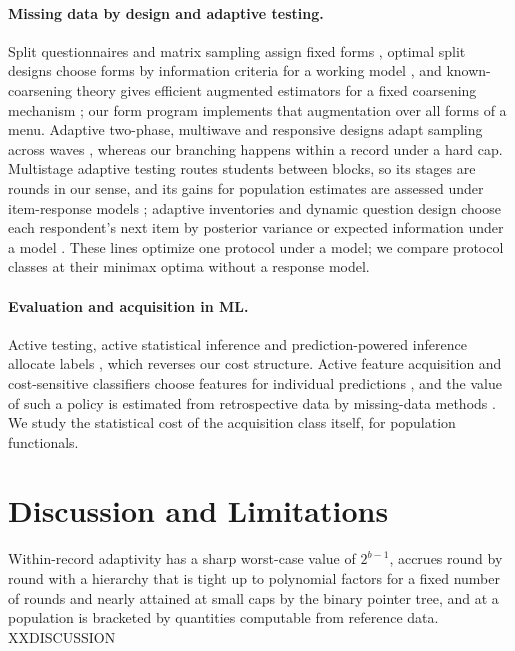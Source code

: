 \documentclass{article}
\begin{document}
\paragraph{Missing data by design and adaptive testing.} Split questionnaires and matrix sampling assign fixed forms \citep{raghunathan1995,graham2006,thomas2006,chipperfield2009,rhemtulla2012}, optimal split designs choose forms by information criteria for a working model \citep{adiguzel2008}, and known-coarsening theory gives efficient augmented estimators for a fixed coarsening mechanism \citep{robins1994,tsiatis2006}; our form program implements that augmentation over all forms of a menu. Adaptive two-phase, multiwave and responsive designs adapt sampling across waves \citep{groves2006,tao2020,chen2020,chen2022}, whereas our branching happens within a record under a hard cap. Multistage adaptive testing routes students between blocks, so its stages are rounds in our sense, and its gains for population estimates are assessed under item-response models \citep{yamamoto2018,fink2024,konig2026}; adaptive inventories and dynamic question design choose each respondent's next item by posterior variance or expected information under a model \citep{montgomery2020,zhang2020,fukuda2026}. These lines optimize one protocol under a model; we compare protocol classes at their minimax optima without a response model.

\paragraph{Evaluation and acquisition in ML.} Active testing, active statistical inference and prediction-powered inference allocate labels \citep{kossen2021,zrnic2024,angelopoulos2023}, which reverses our cost structure. Active feature acquisition and cost-sensitive classifiers choose features for individual predictions \citep{turney1995,trapeznikov2013,nan2017,ma2019,covert2023}, and the value of such a policy is estimated from retrospective data by missing-data methods \citep{vonkleist2025}. We study the statistical cost of the acquisition class itself, for population functionals.

\section{Discussion and Limitations}\label{sec:discussion}
Within-record adaptivity has a sharp worst-case value of $2^{b-1}$, accrues round by round with a hierarchy that is tight up to polynomial factors for a fixed number of rounds and nearly attained at small caps by the binary pointer tree, and at a population is bracketed by quantities computable from reference data. XXDISCUSSION
\end{document}
